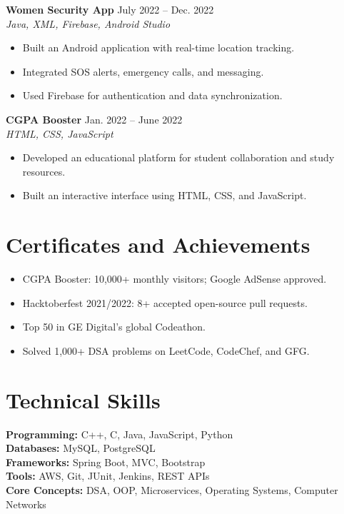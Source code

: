 \documentclass[letterpaper,11pt]{article}
\begin{document}
\textbf{Women Security App} \hfill July 2022 -- Dec. 2022\\
\textit{Java, XML, Firebase, Android Studio}

\begin{itemize}
    \item Built an Android application with real-time location tracking.
    \item Integrated SOS alerts, emergency calls, and messaging.
    \item Used Firebase for authentication and data synchronization.
\end{itemize}

\textbf{CGPA Booster} \hfill Jan. 2022 -- June 2022\\
\textit{HTML, CSS, JavaScript}

\begin{itemize}
    \item Developed an educational platform for student collaboration and study resources.
    \item Built an interactive interface using HTML, CSS, and JavaScript.
\end{itemize}

\section*{Certificates and Achievements}

\begin{itemize}
    \item CGPA Booster: 10,000+ monthly visitors; Google AdSense approved.
    \item Hacktoberfest 2021/2022: 8+ accepted open-source pull requests.
    \item Top 50 in GE Digital's global Codeathon.
    \item Solved 1,000+ DSA problems on LeetCode, CodeChef, and GFG.
\end{itemize}

\section*{Technical Skills}

\textbf{Programming:} C++, C, Java, JavaScript, Python\\
\textbf{Databases:} MySQL, PostgreSQL\\
\textbf{Frameworks:} Spring Boot, MVC, Bootstrap\\
\textbf{Tools:} AWS, Git, JUnit, Jenkins, REST APIs\\
\textbf{Core Concepts:} DSA, OOP, Microservices, Operating Systems, Computer Networks
\end{document}
